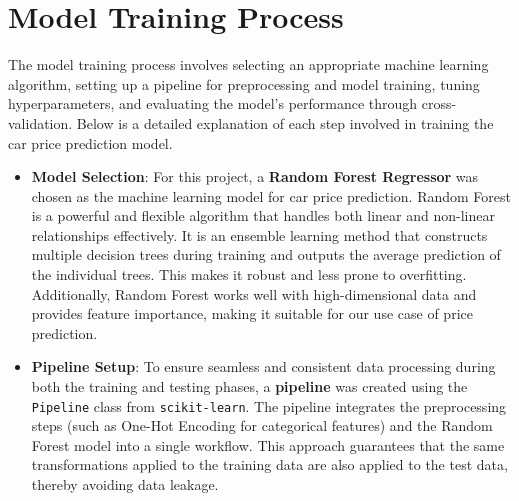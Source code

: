 \documentclass[a4paper,12pt]{article}
\begin{document}
\section{Model Training Process}
\begin{justify}
	The model training process involves selecting an appropriate machine learning algorithm, setting up a pipeline for preprocessing and model training, tuning hyperparameters, and evaluating the model's performance through cross-validation. Below is a detailed explanation of each step involved in training the car price prediction model.
	
	\begin{itemize}
		\item \textbf{Model Selection}: For this project, a \textbf{Random Forest Regressor} was chosen as the machine learning model for car price prediction. Random Forest is a powerful and flexible algorithm that handles both linear and non-linear relationships effectively. It is an ensemble learning method that constructs multiple decision trees during training and outputs the average prediction of the individual trees. This makes it robust and less prone to overfitting. Additionally, Random Forest works well with high-dimensional data and provides feature importance, making it suitable for our use case of price prediction.
		
		\item \textbf{Pipeline Setup}: To ensure seamless and consistent data processing during both the training and testing phases, a \textbf{pipeline} was created using the \texttt{Pipeline} class from \texttt{scikit-learn}. The pipeline integrates the preprocessing steps (such as One-Hot Encoding for categorical features) and the Random Forest model into a single workflow. This approach guarantees that the same transformations applied to the training data are also applied to the test data, thereby avoiding data leakage.
		

\end{itemize}
\end{justify}
\end{document}
